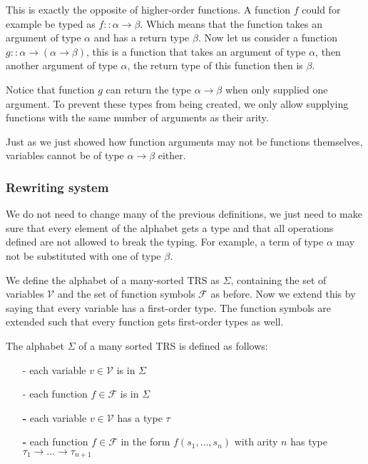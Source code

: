 This is exactly the opposite of higher-order functions. A function $f$ could for example be typed as $f :: \alpha \rightarrow \beta$. Which means that the function takes an argument of type $\alpha$ and has a return type $\beta$. Now let us consider a function $g :: \alpha \rightarrow (\alpha \rightarrow \beta)$, this is a function that takes an argument of type $\alpha$, then another argument of type $\alpha$, the return type of this function then is $\beta$. 

Notice that function $g$ can return the type $\alpha \rightarrow \beta$ when only supplied one argument. To prevent these types from being created, we only allow supplying functions with the same number of arguments as their arity.

Just as we just showed how function arguments may not be functions themselves, variables cannot be of type $\alpha \rightarrow \beta$ either.
\subsubsection{Rewriting system}
We do not need to change many of the previous definitions, we just need to make sure that every element of the alphabet gets a type and that all operations defined are not allowed to break the typing. For example, a term of type $\alpha$ may not be substituted with one of type $\beta$.

We define the alphabet of a many-sorted TRS as $\Sigma$, containing the set of variables $\mathcal{V}$ and the set of function symbols $\mathcal{F}$ as before. Now we extend this by saying that every variable has a first-order type. The function symbols are extended such that every function gets first-order types as well. 
\begin{definition}
The alphabet $\Sigma$ of a many sorted TRS is defined as follows:
\begin{itemize}
    \itemsep -0.4em
    \item[-] each variable $v \in \mathcal{V}$ is in $\Sigma$
    \item[-] each function $f \in \mathcal{F}$ is in $\Sigma$
    \item[\bf-] each variable $v \in \mathcal{V}$ has a type $\tau$
    \item[\bf-] each function $f \in \mathcal{F}$ in the form $f(s_1, \dots, s_n)$ with arity $n$ has type $\tau_1 \rightarrow \dots \rightarrow \tau_{n+1}$
\end{itemize}
\end{definition}


